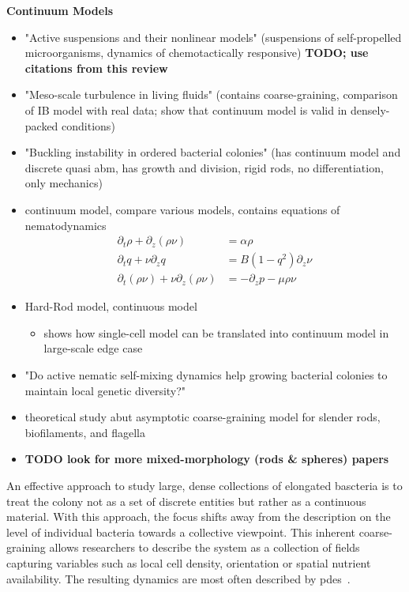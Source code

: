 \textbf{Continuum Models}
\begin{itemize}
    \item \cite{Saintillan2013} "Active suspensions and their nonlinear models" (suspensions of
        self-propelled microorganisms, dynamics of chemotactically responsive)
        \textbf{TODO; use citations from this review}
    \item \cite{Wensink2012} "Meso-scale turbulence in living fluids" (contains coarse-graining,
            comparison of IB model with real data; show that continuum model is valid in
        densely-packed conditions)
    \item \cite{Boyer2011} "Buckling instability in ordered bacterial colonies"
        (has continuum model and discrete quasi abm, has growth and division, rigid rods,
        no differentiation, only mechanics)
    \item \cite{Volfson2008} continuum model, compare various models, contains equations
        of nematodynamics \cite{Doi1988-ad}
        \begin{align}
            \partial_t \rho + \partial_z (\rho \nu) &= \alpha \rho\\
            \partial_t q + \nu \partial_z q &= B(1-q^2) \partial_z \nu\\
            \partial_t(\rho \nu) + \nu \partial_z (\rho \nu) &= - \partial_z p - \mu \rho \nu
        \end{align}
    \item \cite{You2018} Hard-Rod model, continuous model
        \begin{itemize}
            \item shows how single-cell model can be translated into continuum model in
                large-scale edge
                case
        \end{itemize}
    \item \cite{Schwarzendahl2022} "Do active nematic self-mixing dynamics help growing
        bacterial colonies to maintain local genetic diversity?"
    \item \cite{Moreau2018} theoretical study abut asymptotic coarse-graining model for
        slender rods, biofilaments, and flagella
    \item \textbf{TODO look for more mixed-morphology (rods \& spheres) papers}
\end{itemize}

An effective approach to study large, dense collections of elongated bascteria is to
treat the colony not as a set of discrete entities but rather as a continuous material.
With this approach, the focus shifts away from the description on the level of individual
bacteria towards a collective viewpoint.
This inherent coarse-graining allows researchers to describe the system as a collection
of fields capturing variables such as local cell density, orientation or spatial nutrient
availability.
The resulting dynamics are most often described by \acp{pde}~\cite{Volfson2008,Doi1988-ad}.


